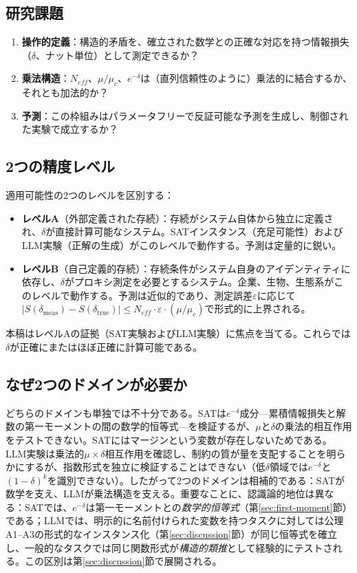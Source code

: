 \documentclass[11pt,a4paper]{article}
\begin{document}
\subsection{研究課題}

\begin{enumerate}
    \item \textbf{操作的定義}：構造的矛盾を、確立された数学との正確な対応を持つ情報損失（$\delta$、ナット単位）として測定できるか？
    \item \textbf{乗法構造}：$N_{eff}$、$\mu/\mu_c$、$e^{-\delta}$は（直列信頼性のように）乗法的に結合するか、それとも加法的か？
    \item \textbf{予測}：この枠組みはパラメータフリーで反証可能な予測を生成し、制御された実験で成立するか？
\end{enumerate}

\subsection{2つの精度レベル}

適用可能性の2つのレベルを区別する：

\begin{itemize}
    \item \textbf{レベルA}（外部定義された存続）：存続がシステム自体から独立に定義され、$\delta$が直接計算可能なシステム。SATインスタンス（充足可能性）およびLLM実験（正解の生成）がこのレベルで動作する。予測は定量的に鋭い。

    \item \textbf{レベルB}（自己定義的存続）：存続条件がシステム自身のアイデンティティに依存し、$\delta$がプロキシ測定を必要とするシステム。企業、生物、生態系がこのレベルで動作する。予測は近似的であり、測定誤差$\varepsilon$に応じて$|S(\delta_{\text{meas}}) - S(\delta_{\text{true}})| \leq N_{eff} \cdot \varepsilon \cdot (\mu/\mu_c)$で形式的に上界される。
\end{itemize}

本稿はレベルAの証拠（SAT実験およびLLM実験）に焦点を当てる。これらでは$\delta$が正確にまたはほぼ正確に計算可能である。

\subsection{なぜ2つのドメインが必要か}

どちらのドメインも単独では不十分である。SATは$e^{-\delta}$成分---累積情報損失と解数の第一モーメントの間の数学的恒等式---を検証するが、$\mu$と$\delta$の乗法的相互作用をテストできない。SATにはマージンという変数が存在しないためである。LLM実験は乗法的$\mu \times \delta$相互作用を確認し、制約の質が量を支配することを明らかにするが、指数形式を独立に検証することはできない（低$\delta$領域では$e^{-\delta}$と$(1-\delta)^k$を識別できない）。したがって2つのドメインは相補的である：SATが数学を支え、LLMが乗法構造を支える。重要なことに、認識論的地位は異なる：SATでは、$e^{-\delta}$は第一モーメントとの\emph{数学的恒等式}（第\ref{sec:first-moment}節）である；LLMでは、明示的に名前付けられた変数を持つタスクに対しては公理A1--A3の形式的なインスタンス化（第\ref{sec:discussion}節）が同じ恒等式を確立し、一般的なタスクでは同じ関数形式が\emph{構造的類推}として経験的にテストされる。この区別は第\ref{sec:discussion}節で展開される。
\end{document}
